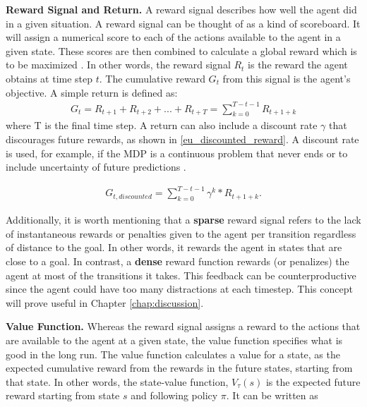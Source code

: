 
\textbf{Reward Signal and Return.}
A reward signal describes how well the agent did in a given situation. A reward signal can be thought of as a kind of scoreboard. It will assign a numerical score to each of the actions available to the agent in a given state. These scores are then combined to calculate a global reward which is to be maximized \cite{sutton2018reinforcement}.
In other words, the reward signal $R_t$ is the reward the agent obtains at time step $t$. The cumulative reward $G_t$ from this signal is the agent's objective. A simple return is defined as:
\begin{gather}
    G_t = R_{t+1} + R_{t+2} + ... + R_{t+T} = \sum_{k=0}^{T-t-1} R_{t+1+k} \label{eu_reward_signal}
\end{gather}
where T is the final time step. A return can also include a discount rate $\gamma$ that discourages future rewards, as shown in \ref{eu_discounted_reward}. A discount rate is used, for example, if the MDP is a continuous problem that never ends or to include uncertainty of future predictions \cite{sutton2018reinforcement}.

\begin{gather}
    G_{t,discounted} = \sum_{k=0}^{T-t-1} \gamma^k * R_{t+1+k}. \label{eu_discounted_reward}
\end{gather}

         Additionally, it is worth mentioning that a \textbf{sparse} reward signal refers to the lack of instantaneous rewards or penalties given to the agent per transition regardless of distance to the goal. In other words, it rewards the agent in states that are close to a goal. In contrast, a \textbf{dense} reward function rewards (or penalizes) the agent at most of the transitions it takes. This feedback can be counterproductive since the agent could have too many distractions at each timestep. This concept will prove useful in Chapter \ref{chap:discussion}.

\textbf{Value Function.}
Whereas the reward signal assigns a reward to the actions that are available to the agent at a given state, the value function specifies what is good in the long run. The value function calculates a value for a state, as the expected cumulative reward from the rewards in the future states, starting from that state. \cite{sutton2018reinforcement}
In other words, the state-value function, $V_{\tau}(s)$ is the expected future reward starting from state $s$ and following policy $\pi$. It can be written as


